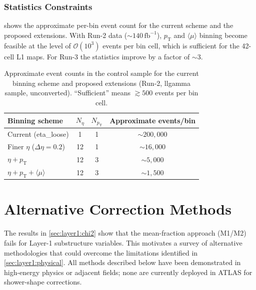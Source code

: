 \documentclass[11pt,a4paper]{article}
\newcommand{\avgmu}{\langle\mu\rangle}
\begin{document}
\subsubsection{Statistics Constraints}

 shows the approximate per-bin event count
for the current scheme and the proposed extensions.  With Run-2 data
($\sim 140\,\mathrm{fb}^{-1}$), $p_\mathrm{T}$ and $\avgmu$ binning
become feasible at the level of $\mathcal{O}(10^3)$ events per bin
cell, which is sufficient for the 42-cell L1 maps.  For Run-3 the
statistics improve by a factor of $\sim$3.

\begin{table}[htbp]
  \centering
  \caption{Approximate event counts in the control sample for the
           current binning scheme and proposed extensions (Run-2,
           llgamma sample, unconverted).  ``Sufficient'' means
           $\gtrsim 500$ events per bin cell.}
  \label{tab:stats_budget}
  \begin{tabular}{lccc}
    \toprule
    Binning scheme & $N_\eta$ & $N_{p_\mathrm{T}}$ & Approximate events/bin \\
    \midrule
    Current (eta\_loose) & 1 & 1 & $\sim 200{,}000$ \\
    Finer $\eta$ ($\Delta\eta=0.2$) & 12 & 1 & $\sim 16{,}000$ \\
    $\eta + p_\mathrm{T}$ & 12 & 3 & $\sim 5{,}000$ \\
    $\eta + p_\mathrm{T} + \avgmu$ & 12 & 3 & $\sim 1{,}500$ \\
    \bottomrule
  \end{tabular}
\end{table}

\section{Alternative Correction Methods}
\label{sec:alternatives}

The results in \cref{sec:layer1:chi2} show that the mean-fraction
approach (M1/M2) fails for Layer-1 substructure variables.  This
motivates a survey of alternative methodologies that could overcome
the limitations identified in \cref{sec:layer1:physical}.  All
methods described below have been demonstrated in high-energy physics
or adjacent fields; none are currently deployed in ATLAS for
shower-shape corrections.
\end{document}
